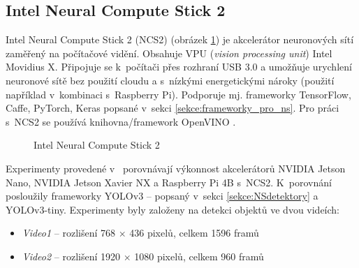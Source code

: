 \subsection*{Intel Neural Compute Stick 2}

Intel Neural Compute Stick 2 (NCS2) \cite{ncs2} (obrázek \ref{obrazek:ncs2}) je akcelerátor neuronových sítí zaměřený na počítačové vidění. Obsahuje VPU (\emph{vision processing unit}) Intel Movidius X. Připojuje se k~počítači přes rozhraní USB 3.0 a umožňuje urychlení neuronové sítě bez použití cloudu a s~nízkými energetickými nároky (použití například v~kombinaci s~Raspberry Pi). Podporuje mj. frameworky TensorFlow, Caffe, PyTorch, Keras popsané v~sekci \ref{sekce:frameworky_pro_ns}. Pro práci s~NCS2 se používá knihovna/framework OpenVINO \cite{openvino}. 

\begin{figure}[H]
  \begin{center}
  \label{obrazek:ncs2}
  \caption{Intel Neural Compute Stick 2 \cite{ncs2}}
  \end{center}
\end{figure}

Experimenty provedené v~\cite{ncs2testYolo} porovnávají výkonnost akcelerátorů NVIDIA Jetson Nano, NVIDIA Jetson Xavier NX a Raspberry Pi 4B s~NCS2. K~porovnání posloužily frameworky YOLOv3 -- popsaný v~sekci \ref{sekce:NSdetektory} a YOLOv3-tiny. Experimenty byly založeny na detekci objektů ve dvou videích:
\begin{itemize}
  \item \emph{Video1} -- rozlišení 768 $\times$ 436 pixelů, celkem 1596 framů
  \item \emph{Video2} -- rozlišení 1920 $\times$ 1080 pixelů, celkem 960 framů 
\end{itemize}

